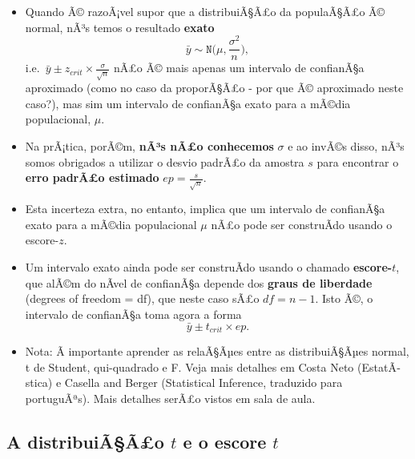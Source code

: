 \documentclass[]{article}
\providecommand{\tightlist}{%
  \setlength{\itemsep}{0pt}\setlength{\parskip}{0pt}}
\begin{document}
\begin{itemize}
\tightlist
\item
  Quando Ã© razoÃ¡vel supor que a distribuiÃ§Ã£o da populaÃ§Ã£o Ã©
  normal, nÃ³s temos o resultado \textbf{exato} \[
    \bar{y}\sim \texttt{N}\bigg(\mu,\frac{\sigma^{2}}{{n}}\bigg),
    \] i.e.~\(\bar{y}\pm z_{crit}\times \frac{\sigma}{\sqrt{n}}\) nÃ£o
  Ã© mais apenas um intervalo de confianÃ§a aproximado (como no caso da
  proporÃ§Ã£o - por que Ã© aproximado neste caso?), mas sim um intervalo
  de confianÃ§a exato para a mÃ©dia populacional, \(\mu\).
\item
  Na prÃ¡tica, porÃ©m, \textbf{nÃ³s nÃ£o conhecemos } \(\sigma\) e ao
  invÃ©s disso, nÃ³s somos obrigados a utilizar o desvio padrÃ£o da
  amostra \(s\) para encontrar o \textbf{erro padrÃ£o estimado}
  \(ep=\frac{s}{\sqrt{n}}.\)
\item
  Esta incerteza extra, no entanto, implica que um intervalo de
  confianÃ§a exato para a mÃ©dia populacional \(\mu\) nÃ£o pode ser
  construÃ­do usando o escore-\(z\).
\item
  Um intervalo exato ainda pode ser construÃ­do usando o chamado
  \textbf{escore-\(t\)}, que alÃ©m do nÃ­vel de confianÃ§a depende dos
  \textbf{graus de liberdade} (degrees of freedom = df), que neste caso
  sÃ£o \(df = n-1\). Isto Ã©, o intervalo de confianÃ§a toma agora a
  forma \[
    \bar{y}\pm t_{crit}\times ep.
    \]
\item
  Nota: Ã importante aprender as relaÃ§Ãµes entre as distribuiÃ§Ãµes
  normal, t de Student, qui-quadrado e F. Veja mais detalhes em Costa
  Neto (EstatÃ­stica) e Casella and Berger (Statistical Inference,
  traduzido para portuguÃªs). Mais detalhes serÃ£o vistos em sala de
  aula.
\end{itemize}

\subsection{\texorpdfstring{A distribuiÃ§Ã£o \(t\) e o escore
\(t\)}{A distribuiÃ§Ã£o t e o escore t}}\label{a-distribuiaao-t-e-o-escore-t}
\end{document}
